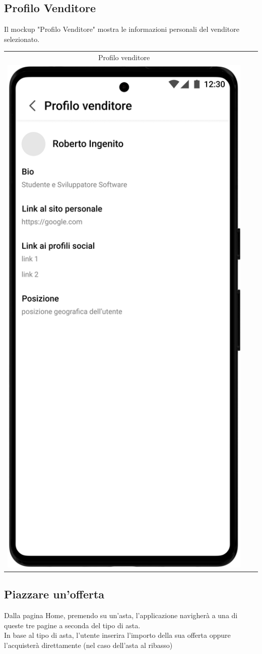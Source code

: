 \newpage
\subsection{Profilo Venditore}
Il mockup "Profilo Venditore" mostra le informazioni personali del venditore selezionato.

\begin{center}
	\begin{tabular}{ccc}
		Profilo venditore                                                         \\
		\includegraphics[width=.3\textwidth]{assets/mockup/Profilo venditore.png} \\
	\end{tabular}
\end{center}

\newpage

\subsection{Piazzare un'offerta}
Dalla pagina Home, premendo su un'asta, l'applicazione navigherà a una di queste tre pagine a seconda del tipo di asta.\\
In base al tipo di asta, l'utente inserira l'importo della sua offerta oppure l'acquisterà direttamente (nel caso dell'asta al ribasso)

